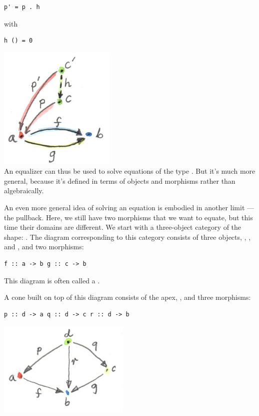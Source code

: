 \begin{verbatim}
p' = p . h
\end{verbatim}

with

\begin{verbatim}
h () = 0
\end{verbatim}

\includegraphics[width=2.19792in]{images/equilizerlimit.jpg}\\
An equalizer can thus be used to solve equations of the type
. But it's much more general, because it's defined
in terms of objects and morphisms rather than algebraically.

An even more general idea of solving an equation is embodied in another
limit --- the pullback. Here, we still have two morphisms that we want
to equate, but this time their domains are different. We start with a
three-object category of the shape:
. The diagram corresponding to
this category consists of three objects, , , and
, and two morphisms:

\begin{verbatim}
f :: a -> b g :: c -> b
\end{verbatim}

This diagram is often called a .

A cone built on top of this diagram consists of the apex, ,
and three morphisms:

\begin{verbatim}
p :: d -> a q :: d -> c r :: d -> b
\end{verbatim}

\includegraphics[width=2.47917in]{images/pullbackcone.jpg}

